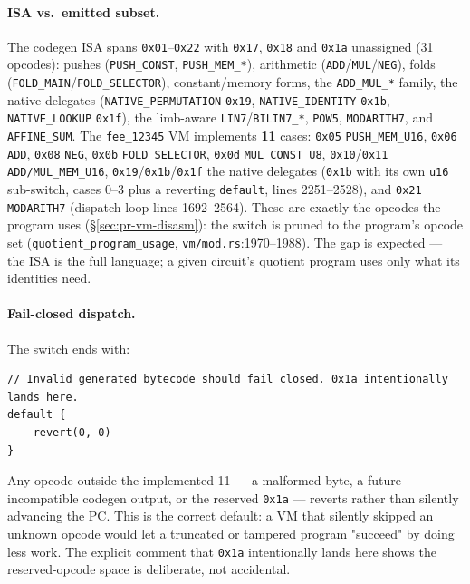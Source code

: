 \paragraph{ISA vs.\ emitted subset.} The codegen ISA spans
\texttt{0x01}--\texttt{0x22} with \texttt{0x17}, \texttt{0x18} and
\texttt{0x1a} unassigned (31 opcodes): pushes
(\texttt{PUSH\_CONST}, \texttt{PUSH\_MEM\_*}), arithmetic
(\texttt{ADD}/\texttt{MUL}/\texttt{NEG}), folds
(\texttt{FOLD\_MAIN}/\texttt{FOLD\_SELECTOR}), constant/memory
forms, the \texttt{ADD\_MUL\_*} family, the native delegates
(\texttt{NATIVE\_\allowbreak{}PERMUTATION} \texttt{0x19},
\texttt{NATIVE\_IDENTITY} \texttt{0x1b}, \texttt{NATIVE\_LOOKUP}
\texttt{0x1f}), the limb-aware \texttt{LIN7}/\texttt{BILIN7\_*},
\texttt{POW5}, \texttt{MODARITH7}, and \texttt{AFFINE\_SUM}. The
\texttt{fee\_12345} VM implements \textbf{11} cases:
\texttt{0x05} \texttt{PUSH\_MEM\_U16}, \texttt{0x06} \texttt{ADD},
\texttt{0x08} \texttt{NEG}, \texttt{0x0b}
\texttt{FOLD\_SELECTOR}, \texttt{0x0d} \texttt{MUL\_CONST\_U8},
\texttt{0x10}/\texttt{0x11} \texttt{ADD/MUL\_MEM\_U16},
\texttt{0x19}/\texttt{0x1b}/\texttt{0x1f} the native delegates
(\texttt{0x1b} with its own \texttt{u16} sub-switch, cases 0--3 plus a
reverting \texttt{default}, lines 2251--2528),
and \texttt{0x21} \texttt{MODARITH7} (dispatch loop lines 1692--2564).
These are exactly the opcodes the program uses
(\S\ref{sec:pr-vm-disasm}): the switch is pruned to the program's
opcode set (\texttt{quotient\_\allowbreak{}program\_\allowbreak{}usage}, \texttt{vm/mod.rs}:1970--1988).
The gap is expected --- the
ISA is the full language; a given circuit's quotient program uses
only what its identities need.

\paragraph{Fail-closed dispatch.} The switch ends with:
\begin{lstlisting}[style=yul]
// Invalid generated bytecode should fail closed. 0x1a intentionally lands here.
default {
    revert(0, 0)
}
\end{lstlisting}
Any opcode outside the implemented 11 --- a malformed byte, a
future-incompatible codegen output, or the reserved \texttt{0x1a}
--- reverts rather than silently advancing the PC. This is the
correct default: a VM that silently skipped an unknown opcode would
let a truncated or tampered program "succeed" by doing less work.
The explicit comment that \texttt{0x1a} intentionally lands here
shows the reserved-opcode space is deliberate, not accidental.

